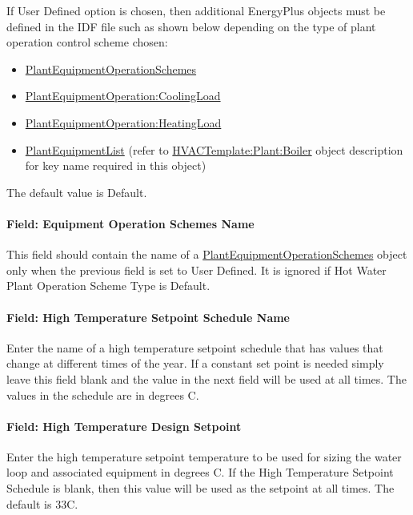 If User Defined option is chosen, then additional EnergyPlus objects must be defined in the IDF file such as shown below depending on the type of plant operation control scheme chosen:

\begin{itemize}
\item
  \hyperref[plantequipmentoperationschemes]{PlantEquipmentOperationSchemes}
\item
  \hyperref[plantequipmentoperationcoolingload]{PlantEquipmentOperation:CoolingLoad}
\item
  \hyperref[plantequipmentoperationheatingload]{PlantEquipmentOperation:HeatingLoad}
\item
  \hyperref[plantequipmentlist]{PlantEquipmentList} (refer to \hyperref[hvactemplateplantboiler]{HVACTemplate:Plant:Boiler} object description for key name required in this object)
\end{itemize}

The default value is Default.

\paragraph{Field: Equipment Operation Schemes Name}\label{field-equipment-operation-schemes-name}

This field should contain the name of a \hyperref[plantequipmentoperationschemes]{PlantEquipmentOperationSchemes} object only when the previous field is set to User Defined. It is ignored if Hot Water Plant Operation Scheme Type is Default.

\paragraph{Field: High Temperature Setpoint Schedule Name}\label{field-high-temperature-setpoint-schedule-name}

Enter the name of a high temperature setpoint schedule that has values that change at different times of the year. If a constant set point is needed simply leave this field blank and the value in the next field will be used at all times. The values in the schedule are in degrees C.

\paragraph{Field: High Temperature Design Setpoint}\label{field-high-temperature-design-setpoint}

Enter the high temperature setpoint temperature to be used for sizing the water loop and associated equipment in degrees C. If the High Temperature Setpoint Schedule is blank, then this value will be used as the setpoint at all times. The default is 33C.

